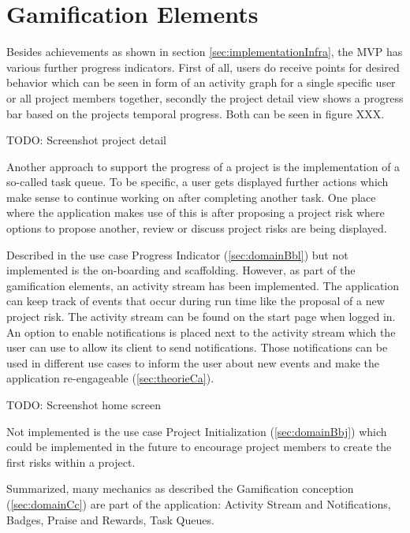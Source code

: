 
\section{Gamification Elements}
\label{sec:implementationGami}

Besides achievements as shown in section \ref{sec:implementationInfra}, the MVP has various further progress indicators. First of all, users do receive points for desired behavior which can be seen in form of an activity graph for a single specific user or all project members together, secondly the project detail view shows a progress bar based on the projects temporal progress. Both can be seen in figure XXX.

TODO: Screenshot project detail

Another approach to support the progress of a project is the implementation of a so-called task queue. To be specific, a user gets displayed further actions which make sense to continue working on after completing another task. One place where the application makes use of this is after proposing a project risk where options to propose another, review or discuss project risks are being displayed.

Described in the use case Progress Indicator (\ref{sec:domainBbl}) but not implemented is the on-boarding and scaffolding. However, as part of the gamification elements, an activity stream has been implemented. The application can keep track of events that occur during run time like the proposal of a new project risk. The activity stream can be found on the start page when logged in. An option to enable notifications is placed next to the activity stream which the user can use to allow its client to send notifications. Those notifications can be used in different use cases to inform the user about new events and make the application re-engageable (\ref{sec:theorieCa}).

TODO: Screenshot home screen

Not implemented is the use case Project Initialization (\ref{sec:domainBbj}) which could be implemented in the future to encourage project members to create the first risks within a project.

Summarized, many mechanics as described the Gamification conception (\ref{sec:domainCc}) are part of the application: Activity Stream and Notifications, Badges, Praise and Rewards, Task Queues.